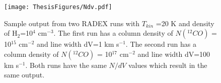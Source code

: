 \begin{figure}[h]
\centering
\texttt{[image: ThesisFigures/Ndv.pdf]} %
\caption[Sample output from two RADEX runs]{Sample output from two RADEX runs with $T_{kin}$ =20 K and density of H$_{2}$=10$^{4}$ cm$^{-3}$. The first run has a column density of $N(^{12}CO)$ = 10$^{15}$ cm$^{-2}$ and line width dV=1 km s$^{-1}$. The second run has a column density of $N(^{12}CO)$ = 10$^{17}$ cm$^{-2}$ and line width dV=100 km s$^{-1}$. Both runs have the same $N/dV$ values which result in the same output.}
\label{radexoutput}
\end{figure}
